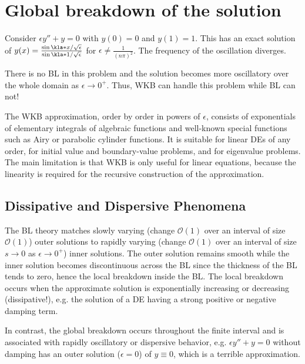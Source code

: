 \documentclass[english, parskip=full]{scrbook}
\newcommand{\note}[1]{\begin{tcolorbox}[colback=colorbackgroundnote,colframe=colornote, breakable,enhanced]#1\end{tcolorbox}}
\begin{document}
\section{Global breakdown of the solution}
Consider $\epsilon y''+y=0$ with $y(0)=0$ and $y(1)=1$.
This has an exact solution of $y(x)=\frac{\sin\kla*{x/\sqrt{\epsilon}}}{\sin\kla*{1/\sqrt{\epsilon}}}$ for $\epsilon \neq \frac{1}{(n\pi)^2}$.
The frequency of the oscillation diverges.
\note{
There is no BL in this problem and the solution becomes more oscillatory over the whole domain as $\epsilon\rightarrow 0^+$.
Thus, WKB can handle this problem while BL can not!
}
The WKB approximation, order by order in powers of $\epsilon$, consists of exponentials of elementary integrals of algebraic functions and well-known special functions such as Airy or parabolic cylinder functions.
It is suitable for linear DEs of any order, for initial value and boundary-value problems, and for eigenvalue problems.
The main limitation is that WKB is only useful for linear equations, because the linearity is required for the recursive construction of the approximation.
\subsection{Dissipative and Dispersive Phenomena}
The BL theory matches slowly varying (change $\mathcal{O}(1)$ over an interval of size $\mathcal{O}(1)$) outer solutions to rapidly varying (change $\mathcal{O}(1)$ over an interval of size $s\rightarrow 0$ as $\epsilon\rightarrow 0^+$) inner solutions.
The outer solution remains smooth while the inner solution becomes discontinuous across the BL since the thickness of the BL tends to zero, hence the local breakdown inside the BL.
The local breakdown occurs when the approximate solution is exponentially increasing or decreasing (dissipative!), e.g. the solution of a DE having a strong positive or negative damping term.

In contrast, the global breakdown occurs throughout the finite interval and is associated with rapidly oscillatory or dispersive behavior, e.g. $\epsilon y''+y=0$ without damping has an outer solution ($\epsilon=0$) of $y\equiv 0$, which is a terrible approximation.
\end{document}
